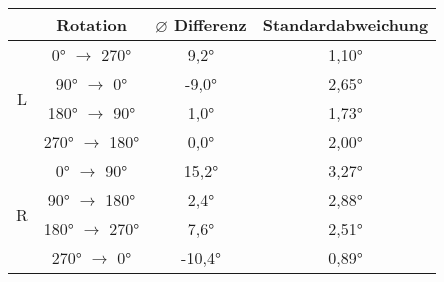 \begin{tabular}{c|c|c|c}
    & Rotation & $\varnothing$ Differenz & Standardabweichung \\ \hline\hline
    \multirow{4}{*}{L} & 0° $\to$ 270°   & 9,2°   & 1,10° \\
                       & 90° $\to$ 0°    & -9,0°  & 2,65° \\
                       & 180° $\to$ 90°  & 1,0°   & 1,73° \\
                       & 270° $\to$ 180° & 0,0°   & 2,00° \\ \hline\hline
    \multirow{4}{*}{R} & 0° $\to$ 90°    & 15,2°  & 3,27° \\
                       & 90° $\to$ 180°  & 2,4°   & 2,88° \\
                       & 180° $\to$ 270° & 7,6°   & 2,51° \\
                       & 270° $\to$ 0°   & -10,4° & 0,89°
\end{tabular}
